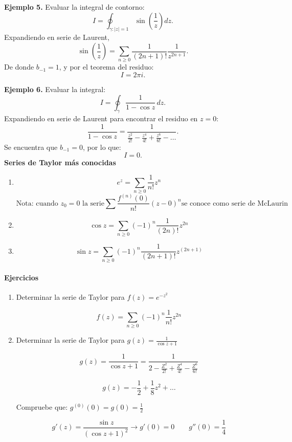 \documentclass[a4paper,12pt]{article}
\begin{document}
\textbf{Ejemplo 5.} Evaluar la integral de contorno:
\[
I = \oint_{\gamma: |z|=1} \sin \left( \frac{1}{z} \right) dz.
\]
Expandiendo en serie de Laurent,
\[
\sin \left( \frac{1}{z} \right) = \sum_{n \geq 0} \frac{1}{(2n+1)!} \frac{1}{z^{2n+1}}.
\]
De donde $b_{-1} = 1$, y por el teorema del residuo:
\[
I = 2\pi i.
\]

\textbf{Ejemplo 6.} Evaluar la integral:
\[
I = \oint_{\gamma} \frac{1}{1 - \cos z} \, dz.
\]
Expandiendo en serie de Laurent para encontrar el residuo en $z = 0$:
\[
\frac{1}{1 - \cos z} = \frac{1}{\frac{z^2}{2!} - \frac{z^4}{4!} + \frac{z^6}{6!} - \dots}.
\]
Se encuentra que $b_{-1} = 0$, por lo que:
\[
I = 0.
\]
{\large \bf Series de Taylor más conocidas}

\begin{enumerate}
    \item \[e^z = \sum_{n \geq 0} \frac{1}{n!} z^n\]
 \[ \text{Nota: cuando $z_0 = 0$ la serie} \sum \frac{f^{(n)}(0)}{n!} (z - 0)^n \text{se conoce como serie de McLaurin}\] 

\item \[\cos z = \sum_{n \geq 0} (-1)^n \frac{1}{(2n)!} z^{2n}\]

\item \[\sin z = \sum_{n \geq 0} (-1)^n \frac{1}{(2n + 1)!} z^{(2n + 1)}\]
\end{enumerate}


\paragraph{Ejercicios}

\begin{enumerate}
    \item Determinar la serie de Taylor para $f(z) = e^{-z^2}$

\[
f(z) = \sum_{n \geq 0} (-1)^n \frac{1}{n!} z^{2n}
\]

\item Determinar la serie de Taylor para $g(z) = \frac{1}{\cos z + 1}$

\[
g(z) = \frac{1}{\cos z + 1} = \frac{1}{2 - \frac{Z^2}{2!} + \frac{Z^4}{4!} - \frac{Z^6}{6!}}
\]


\[
g(z) = -\frac{1}{2} + \frac{1}{8} z^2 + \ldots
\]

Compruebe que: \quad $g^{(0)}(0) = g(0) = \frac{1}{2}$

\[
g'(z) = \frac{\sin z}{(\cos z + 1)^2} \rightarrow g'(0) = 0 \quad \quad g''(0) = \frac{1}{4}
\]
\end{enumerate}
\end{document}
